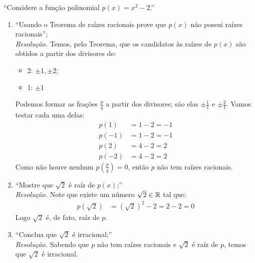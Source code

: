 \enquote{Considere a função polinomial $p(x) = x^2 - 2$.}
\begin{enumerate}
    \item \enquote{Usando o Teorema de raízes racionais prove que $p(x)$ não
    possui raízes racionais}; \\
    \emph{Resolução.} Temos, pelo Teorema, que os candidatos às raízes de $p(x)$ são obtidos a partir dos divisores de:
    \begin{itemize}
        \item 2: $\pm 1, \pm 2$;
        \item 1: $\pm 1$
    \end{itemize}
    Podemos formar as frações $\frac{p}{q}$ a partir dos divisores; são elas $\pm \frac{1}{1}$ e $\pm \frac{2}{1}$. Vamos testar cada uma delas:
    \begin{align*}
        p(1) &= 1 - 2 = -1 \\
        p(-1) &= 1 - 2 = -1 \\
        p(2) &= 4 - 2 = 2 \\
        p(-2) &= 4 - 2 = 2
    \end{align*}
    Como não houve nenhum $p(\frac{p}{q}) = 0$, então $p$ não tem raízes racionais.
    \item \enquote{Mostre que $\sqrt{2}$ é raíz de $p(x)$;} \\
    \emph{Resolução.} Note que existe um número $\sqrt{2} \in \mathbb R$ tal que: 
    \begin{align*}
        p(\sqrt{2}) &= (\sqrt{2})^2 - 2 = 2 - 2 = 0
    \end{align*}
    Logo $\sqrt{2}$ é, de fato, raíz de $p$.
    \item \enquote{Conclua que $\sqrt{2}$ é irracional;} \\
    \emph{Resolução.} Sabendo que $p$ não tem raízes racionais e $\sqrt{2}$ é raíz de $p$, temos que $\sqrt{2}$ é irracional.
\end{enumerate}
